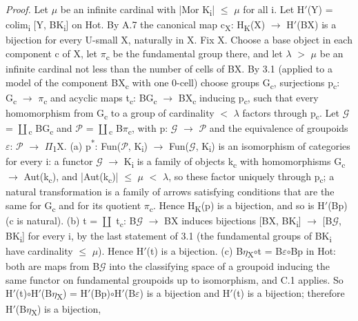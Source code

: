 \emph{Proof.} Let \ensuremath{\mu} be an infinite cardinal with |Mor K\textsubscript{i}| \ensuremath{\leq} \ensuremath{\mu} for all i. Let H\ensuremath{\prime}(Y) = colim\textsubscript{i} [Y, BK\textsubscript{i}] on Hot. By A.7 the canonical map c\textsubscript{X}: H\textsubscript{K}(X) \ensuremath{\to} H\ensuremath{\prime}(BX) is a bijection for every U-small X, naturally in X. Fix X. Choose a base object in each component c of X, let \ensuremath{\pi}\textsubscript{c} be the fundamental group there, and let \ensuremath{\lambda} \ensuremath{>} \ensuremath{\mu} be an infinite cardinal not less than the number of cells of BX. By 3.1 (applied to a model of the component BX\textsubscript{c} with one 0-cell) choose groups G\textsubscript{c}, surjections p\textsubscript{c}: G\textsubscript{c} \ensuremath{\to} \ensuremath{\pi}\textsubscript{c} and acyclic maps t\textsubscript{c}: BG\textsubscript{c} \ensuremath{\to} BX\textsubscript{c} inducing p\textsubscript{c}, such that every homomorphism from G\textsubscript{c} to a group of cardinality \ensuremath{<} \ensuremath{\lambda} factors through p\textsubscript{c}. Let \ensuremath{\mathcal G} = \ensuremath{\coprod}\textsubscript{c} BG\textsubscript{c} and \ensuremath{\mathcal P} = \ensuremath{\coprod}\textsubscript{c} B\ensuremath{\pi}\textsubscript{c}, with p: \ensuremath{\mathcal G} \ensuremath{\to} \ensuremath{\mathcal P} and the equivalence of groupoids \ensuremath{\varepsilon}: \ensuremath{\mathcal P} \ensuremath{\to} \ensuremath{\Pi}\textsubscript{1}X. (a) p\textsuperscript{*}: Fun(\ensuremath{\mathcal P}, K\textsubscript{i}) \ensuremath{\to} Fun(\ensuremath{\mathcal G}, K\textsubscript{i}) is an isomorphism of categories for every i: a functor \ensuremath{\mathcal G} \ensuremath{\to} K\textsubscript{i} is a family of objects k\textsubscript{c} with homomorphisms G\textsubscript{c} \ensuremath{\to} Aut(k\textsubscript{c}), and |Aut(k\textsubscript{c})| \ensuremath{\leq} \ensuremath{\mu} \ensuremath{<} \ensuremath{\lambda}, so these factor uniquely through p\textsubscript{c}; a natural transformation is a family of arrows satisfying conditions that are the same for G\textsubscript{c} and for its quotient \ensuremath{\pi}\textsubscript{c}. Hence H\textsubscript{K}(p) is a bijection, and so is H\ensuremath{\prime}(Bp) (c is natural). (b) t = \ensuremath{\coprod} t\textsubscript{c}: B\ensuremath{\mathcal G} \ensuremath{\to} BX induces bijections [BX, BK\textsubscript{i}] \ensuremath{\to} [B\ensuremath{\mathcal G}, BK\textsubscript{i}] for every i, by the last statement of 3.1 (the fundamental groups of BK\textsubscript{i} have cardinality \ensuremath{\leq} \ensuremath{\mu}). Hence H\ensuremath{\prime}(t) is a bijection. (c) B\ensuremath{\eta}\textsubscript{X}\ensuremath{\circ}t = B\ensuremath{\varepsilon}\ensuremath{\circ}Bp in Hot: both are maps from B\ensuremath{\mathcal G} into the classifying space of a groupoid inducing the same functor on fundamental groupoids up to isomorphism, and C.1 applies. So H\ensuremath{\prime}(t)\ensuremath{\circ}H\ensuremath{\prime}(B\ensuremath{\eta}\textsubscript{X}) = H\ensuremath{\prime}(Bp)\ensuremath{\circ}H\ensuremath{\prime}(B\ensuremath{\varepsilon}) is a bijection and H\ensuremath{\prime}(t) is a bijection; therefore H\ensuremath{\prime}(B\ensuremath{\eta}\textsubscript{X}) is a bijection, 